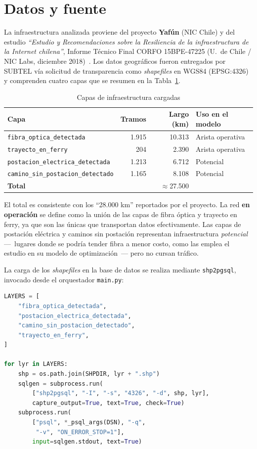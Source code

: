 \documentclass[12pt,a4paper]{article}
\begin{document}
\section{Datos y fuente}

La infraestructura analizada proviene del proyecto \textbf{Yafún} (NIC
Chile) y del estudio \emph{``Estudio y Recomendaciones sobre la Resiliencia
de la infraestructura de la Internet chilena''}, Informe Técnico Final
CORFO 15BPE-47225 (U.\ de Chile / NIC Labs, diciembre 2018)~\cite{niclabs2018}.  Los datos geográficos fueron entregados por SUBTEL vía
solicitud de transparencia como \textit{shapefiles} en WGS84 (EPSG:4326) y
comprenden cuatro capas que se resumen en la Tabla~\ref{tab:capas}.

\begin{table}[H]
\centering
\caption{Capas de infraestructura cargadas}
\label{tab:capas}
\begin{tabular}{lrrp{5cm}}
\toprule
\textbf{Capa} & \textbf{Tramos} & \textbf{Largo (km)} & \textbf{Uso en el modelo} \\
\midrule
\texttt{fibra\_optica\_detectada}     & 1.915 & 10.313 & Arista operativa \\
\texttt{trayecto\_en\_ferry}          &   204 &  2.390 & Arista operativa \\
\texttt{postacion\_electrica\_detectada} & 1.213 & 6.712 & Potencial \\
\texttt{camino\_sin\_postacion\_detectado} & 1.165 & 8.108 & Potencial \\
\midrule
\multicolumn{2}{l}{\textbf{Total}} & $\approx$27.500 & \\
\bottomrule
\end{tabular}
\end{table}

El total es consistente con los ``28.000 km'' reportados por el proyecto.
La red \textbf{en operación} se define como la unión de las capas de fibra
óptica y trayecto en ferry, ya que son las únicas que transportan datos
efectivamente.  Las capas de postación eléctrica y caminos sin postación
representan infraestructura \textit{potencial} ---~lugares donde se podría
tender fibra a menor costo, como las emplea el estudio en su modelo de
optimización~--- pero no cursan tráfico.

La carga de los \textit{shapefiles} en la base de datos se realiza mediante
\texttt{shp2pgsql}, invocado desde el orquestador \texttt{main.py}:

\begin{lstlisting}[language=Python,caption={Carga de shapefiles (main.py)}]
LAYERS = [
    "fibra_optica_detectada",
    "postacion_electrica_detectada",
    "camino_sin_postacion_detectado",
    "trayecto_en_ferry",
]

for lyr in LAYERS:
    shp = os.path.join(SHPDIR, lyr + ".shp")
    sqlgen = subprocess.run(
        ["shp2pgsql", "-I", "-s", "4326", "-d", shp, lyr],
        capture_output=True, text=True, check=True)
    subprocess.run(
        ["psql", *_psql_args(DSN), "-q",
         "-v", "ON_ERROR_STOP=1"],
        input=sqlgen.stdout, text=True)
\end{lstlisting}
\end{document}
